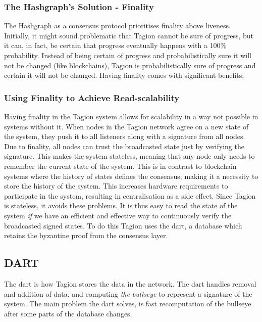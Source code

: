 \subsubsection{The Hashgraph's Solution - Finality}
    The Hashgraph as a consensus protocol prioritises \gls{finality} above \gls{liveness}. Initially, it might sound problematic that Tagion cannot be sure of progress, but it can, in fact, be certain that progress eventually happens with a 100\% probability. Instead of being certain of progress and probabilistically sure it will not be changed (like blockchains), Tagion is probabilistically sure of progress and certain it will not be changed. Having \gls{finality} comes with significant benefits:

\subsubsection{Using Finality to Achieve Read-scalability}
    Having \gls{finality} in the Tagion system allows for scalability in a way not possible in systems without it. When nodes in the Tagion network agree on a new state of the system, they push it to all listeners along with a signature from all nodes. Due to \gls{finality}, all nodes can trust the broadcasted state just by verifying the signature. This makes the system stateless, meaning that any node only needs to remember the current state of the system. This is in contrast to blockchain systems where the history of states defines the consensus; making it a necessity to store the history of the system. This increases hardware requirements to participate in the system, resulting in centralisation as a side effect. Since Tagion is stateless, it avoids these problems. It is thus easy to read the state of the system \textit{if} we have an efficient and effective way to continuously verify the broadcasted signed states. To do this Tagion uses the \gls{dart}, a database which retains the byzantine proof from the consensus layer.

\subsection{DART}
    The \gls{dart} is how Tagion stores the data in the network. The \gls{dart} handles removal and addition of data, and computing \textit{the bullseye} to represent a signature of the system. The main problem the \gls{dart} solves, is fast recomputation of the bullseye after some parts of the database changes. 

